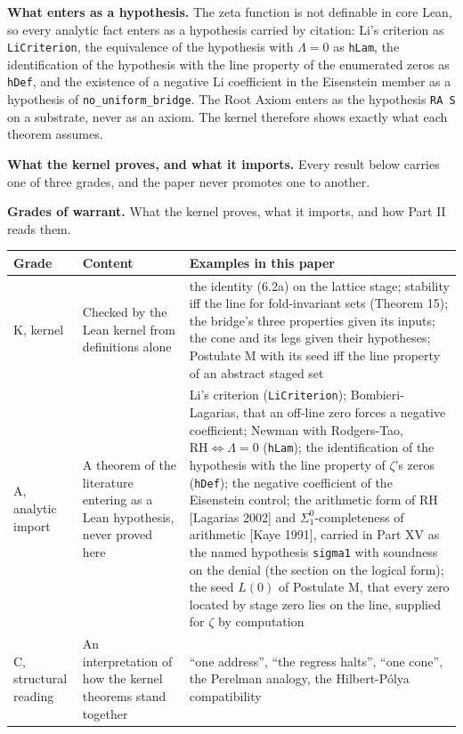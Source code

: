 \documentclass[10pt]{article}
\begin{document}
\textbf{What enters as a hypothesis.} The zeta function is not definable
in core Lean, so every analytic fact enters as a hypothesis carried by
citation: Li's criterion as \texttt{LiCriterion}, the equivalence of the
hypothesis with \(\Lambda = 0\) as \texttt{hLam}, the identification of
the hypothesis with the line property of the enumerated zeros as
\texttt{hDef}, and the existence of a negative Li coefficient in the
Eisenstein member as a hypothesis of \texttt{no\_uniform\_bridge}. The
Root Axiom enters as the hypothesis \texttt{RA\ S} on a substrate, never
as an axiom. The kernel therefore shows exactly what each theorem
assumes.

\textbf{What the kernel proves, and what it imports.} Every result below
carries one of three grades, and the paper never promotes one to
another.

\begin{table}[!htbp]
\centering\small
\renewcommand{\arraystretch}{1.12}
\raggedright \textbf{Grades of warrant.} What the kernel proves, what it imports, and how Part II reads them.\par\smallskip
\begin{tabularx}{\textwidth}{@{}P{0.13\textwidth} P{0.22\textwidth} L@{}}
\toprule
\textbf{Grade} & \textbf{Content} & \textbf{Examples in this paper} \\
\midrule
K, kernel & Checked by the Lean kernel from definitions alone & the identity (6.2a) on the lattice stage; stability iff the line for fold-invariant sets (Theorem 15); the bridge's three properties given its inputs; the cone and its legs given their hypotheses; Postulate M with its seed iff the line property of an abstract staged set \\
A, analytic import & A theorem of the literature entering as a Lean hypothesis, never proved here & Li's criterion (\texttt{LiCriterion}); Bombieri-Lagarias, that an off-line zero forces a negative coefficient; Newman with Rodgers-Tao, \(\mathrm{RH} \iff \Lambda = 0\) (\texttt{hLam}); the identification of the hypothesis with the line property of \(\zeta\)'s zeros (\texttt{hDef}); the negative coefficient of the Eisenstein control; the arithmetic form of RH {[}Lagarias 2002{]} and \(\Sigma^0_1\)-completeness of arithmetic {[}Kaye 1991{]}, carried in Part XV as the named hypothesis \texttt{sigma1} with soundness on the denial (the section on the logical form); the seed \(L(0)\) of Postulate M, that every zero located by stage zero lies on the line, supplied for \(\zeta\) by computation \\
C, structural reading & An interpretation of how the kernel theorems stand together & ``one address'', ``the regress halts'', ``one cone'', the Perelman analogy, the Hilbert-Pólya compatibility \\
\bottomrule
\end{tabularx}
\end{table}
\end{document}
